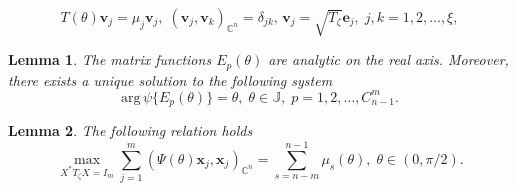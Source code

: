\documentclass[10pt,a4paper]{amsart}
\newtheorem{lemma}{Lemma}
\begin{document}
\begin{equation}\label{8}
T(\theta)\mathbf{v}_{j} =\mu_{j}\mathbf{v}_{j},\;(\mathbf{v}_{j},\mathbf{v}_{k})_{\mathbb{C}^{n}}=\delta_{jk},\,\mathbf{v}_{j}=\sqrt{T_{\zeta}}\mathbf{e}_{j},\;j,k=1,2,\dots,\xi,
\end{equation}

\begin{lemma}\label{L2}
The matrix functions $E_{p}(\theta)$ are analytic on the real axis. Moreover, there exists a unique  solution to the following system
\begin{equation}\label{9}
\mathrm{arg}\, \psi\{E_{p}(\theta)\}=\theta,\;\theta\in \mathbb{J},\;p=1,2,\dots,C_{n-1}^{m}.
\end{equation}
\end{lemma}

\begin{lemma}\label{L3} The following relation holds
\begin{equation}\label{10}
 \max\limits_{X^{\ast}T_{\zeta}X= I_{m}} \sum\limits_{j=1}^{m}(\Psi(\theta)\mathbf{x}_{j},\mathbf{x}_{j})_{\mathbb{C}^{n}}=\sum\limits_{s=n-m }^{n-1}\mu_{s}(\theta),\;\theta\in (0,\pi/2).
\end{equation}
\end{lemma}
\end{document}

